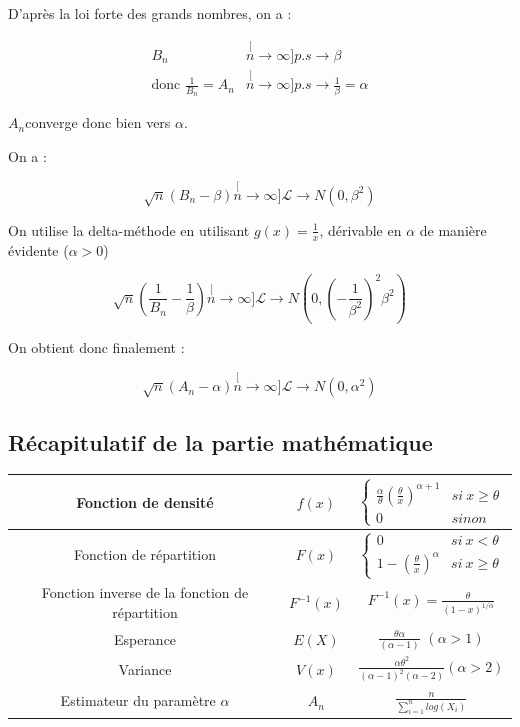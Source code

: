 \documentclass{article}
\providecommand{\tabularnewline}{\\}
\begin{document}
D'après la loi forte des grands nombres, on a :

\begin{align*}
B_{n} & \stackrel[n\rightarrow\infty]{p.s}{\rightarrow}\beta\\
\text{donc }\frac{1}{B_{n}}=A_{n} & \stackrel[n\rightarrow\infty]{p.s}{\rightarrow}\frac{1}{\beta}=\alpha
\end{align*}

$A_{n}$converge donc bien vers $\alpha$.

On a :

\[
\sqrt{n}(B_{n}-\beta)\stackrel[n\rightarrow\infty]{\mathcal{L}}{\rightarrow}N(0,\beta^{2})
\]

On utilise la delta-méthode en utilisant $g(x)=\frac{1}{x}$, dérivable
en $\alpha$ de manière évidente ($\alpha>0$)

\[
\sqrt{n}(\frac{1}{B_{n}}-\frac{1}{\beta})\stackrel[n\rightarrow\infty]{\mathcal{L}}{\rightarrow}N(0,(-\frac{1}{\beta^{2}})^{2}\beta^{2})
\]

On obtient donc finalement :

\[
\sqrt{n}(A_{n}-\alpha)\stackrel[n\rightarrow\infty]{\mathcal{L}}{\rightarrow}N(0,\alpha^{2})
\]


\subsection{Récapitulatif de la partie mathématique}

\begin{tabular}{|c|c|c|}
\hline 
Fonction de densité & $f(x)$ & $\begin{cases}
\frac{\alpha}{\theta}(\frac{\theta}{x})^{\alpha+1} & si\ x\geq\theta\\
0 & sinon
\end{cases}$\tabularnewline
\hline 
Fonction de répartition & $F(x)$ & $\begin{cases}
0 & si\ x<\theta\\
1-(\frac{\theta}{x})^{\alpha} & si\ x\geq\theta
\end{cases}$\tabularnewline
\hline 
Fonction inverse de la fonction de répartition & $F^{-1}(x)$ & 

$F^{-1}(x)=\frac{\theta}{(1-x)^{1/\alpha}}$

\tabularnewline
\hline 
Esperance & $E(X)$ & $\frac{\theta\alpha}{(\alpha-1)}$ $(\alpha>1)$\tabularnewline
\hline 
Variance & $V(x)$ & $\frac{\alpha\theta^{2}}{(\alpha-1)^{2}(\alpha-2)}$$(\alpha>2)$\tabularnewline
\hline 
Estimateur du paramètre $\alpha$ & $A_{n}$ & $\frac{n}{\sum_{i=1}^{n}log(X_{i})}$\tabularnewline
\hline 
\end{tabular}
\end{document}
